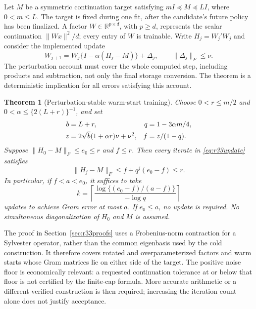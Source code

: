 \documentclass[ecta,nameyear,draft]{econsocart}
\newtheorem{theorem}{Theorem}
\theoremstyle{definition}
\theoremstyle{remark}
\newcommand{\R}{\mathbb R}
\begin{document}
Let $M$ be a symmetric continuation target satisfying
$mI\preceq M\preceq LI$, where $0<m\leq L$. The target is fixed during
one fit, after the candidate's future policy has been finalized. A factor
$W\in\R^{p\times d}$, with $p\geq d$, represents the scalar continuation
$\|Wx\|^2/d$; every entry of $W$ is trainable. Write
$H_j=W_j'W_j$ and consider the implemented update
\begin{equation}\label{eq:r33update}
 W_{j+1}=W_j\{I-\alpha(H_j-M)\}+\Delta_j,
 \qquad \|\Delta_j\|_F\leq\nu.
\end{equation}
The perturbation account must cover the whole computed step, including
products and subtraction, not only the final storage conversion. The theorem
is a deterministic implication for all errors satisfying this account.

\begin{theorem}[Perturbation-stable warm-start training]\label{thm:r33warm}
Choose $0<r\leq m/2$ and $0<\alpha\leq\{2(L+r)\}^{-1}$, and set
\begin{align}
 b&=L+r, & q&=1-3\alpha m/4,\notag\\
 z&=2\sqrt b(1+\alpha r)\nu+\nu^2,&
 f&=z/(1-q).\label{eq:r33noise}
\end{align}
Suppose $\|H_0-M\|_F\leq e_0\leq r$ and $f\leq r$. Then every iterate
in \eqref{eq:r33update} satisfies
\begin{equation}\label{eq:r33envelope}
 \|H_j-M\|_F\leq f+q^j(e_0-f)\leq r.
\end{equation}
In particular, if $f<a<e_0$, it suffices to take
\begin{equation}\label{eq:r33cap}
 k=\left\lceil\frac{\log\{(e_0-f)/(a-f)\}}{-\log q}\right\rceil
\end{equation}
updates to achieve Gram error at most $a$. If $e_0\leq a$, no update is
required. No simultaneous diagonalization of $H_0$ and $M$ is assumed.
\end{theorem}

The proof in Section~\ref{sec:r33proofs} uses a Frobenius-norm contraction
for a Sylvester operator, rather than the common eigenbasis used by the cold
construction. It therefore covers rotated and overparameterized factors and
warm starts whose Gram matrices lie on either side of the target. The positive
noise floor is economically relevant: a requested continuation tolerance at
or below that floor is not certified by the finite-cap formula. More accurate
arithmetic or a different verified construction is then required; increasing
the iteration count alone does not justify acceptance.
\end{document}
